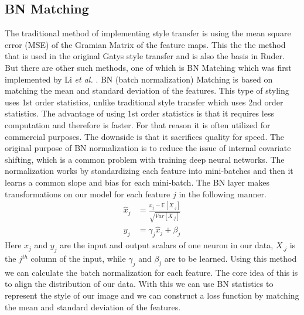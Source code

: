 \subsection{BN Matching}
The traditional method of implementing style transfer is using the mean square error (MSE) of the Gramian Matrix of the feature maps. This the the method that is used in the original Gatys style transfer and is also the basis in Ruder. But there are other such methods, one of which is BN Matching which was first implemented by Li \textit{et al.} \cite{Li:1}.\newline\newline
BN (batch normalization) Matching is based on matching the mean and standard deviation of the features. This type of styling uses 1st order statistics, unlike traditional style transfer which uses 2nd order statistics. The advantage of using 1st order statistics is that it requires less computation and therefore is faster. For that reason it is often utilized for commercial purposes. The downside is that it sacrifices quality for speed.\newline\newline
The original purpose of BN normalization is to reduce the issue of internal covariate shifting, which is a common problem with training deep neural networks. The normalization works by standardizing each feature into mini-batches and then it learns a common slope and bias for each mini-batch. The BN layer makes transformations on our model for each feature $j$ in the following manner.
\begin{equation}
\begin{aligned}
\label{eq:batch_normalization}
    \hat{x}_j&=\frac{x_j-{\mathbb{E}}[X_{.j}]}{\sqrt{Var[X_{.j}]}}\\
    y_j&=\gamma_j\hat{x}_j + \beta_j
\end{aligned}
\end{equation}
Here $x_j$ and $y_j$ are the input and output scalars of one neuron in our data, $X_{.j}$ is the $j^{th}$ column of the input, while $\gamma_j$ and $\beta_j$ are to be learned. Using this method we can calculate the batch normalization for each feature. The core idea of this is to align the distribution of our data.  With this we can use BN statistics to represent the style of our image and we can construct a loss function by matching the mean and standard deviation of the features. 


